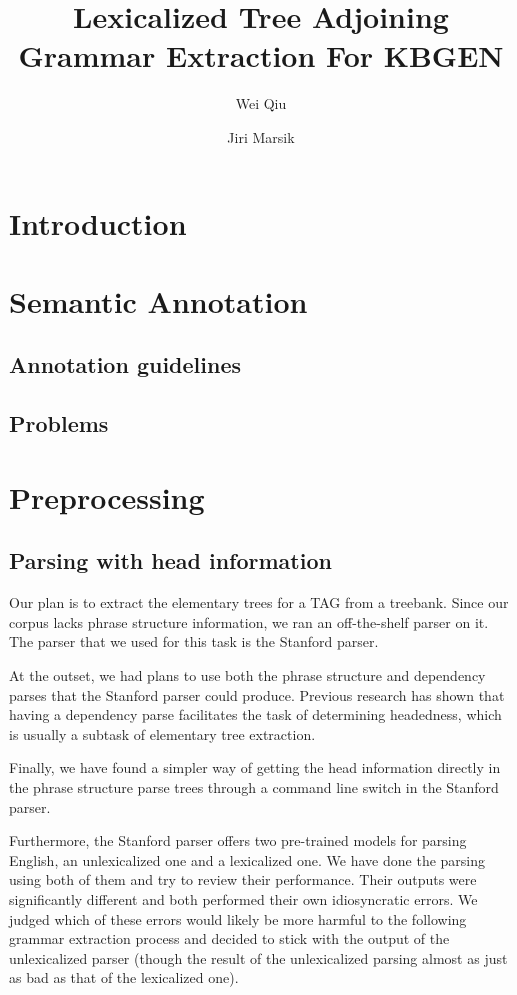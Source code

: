 \documentclass[a4paper]{article}
\title{Lexicalized Tree Adjoining Grammar Extraction For KBGEN}
\author{Wei Qiu \and Jiri Marsik}
\begin{document}
\maketitle
\begin{abstract}
\end{abstract}
\section{Introduction}
\section{Semantic Annotation}
\label{sec:sem-annot}
\subsection{Annotation guidelines}
\subsection{Problems}


\section{Preprocessing}

\subsection{Parsing with head information}

Our plan is to extract the elementary trees for a TAG from a treebank.
Since our corpus lacks phrase structure information, we ran an
off-the-shelf parser on it. The parser that we used for this task is
the Stanford parser.

At the outset, we had plans to use both the phrase structure and
dependency parses that the Stanford parser could produce. Previous
research has shown that having a dependency parse facilitates the task
of determining headedness, which is usually a subtask of elementary
tree extraction.

Finally, we have found a simpler way of getting the head information
directly in the phrase structure parse trees through a command line
switch in the Stanford parser.


Furthermore, the Stanford parser offers two pre-trained models for
parsing English, an unlexicalized one and a lexicalized one. We have
done the parsing using both of them and try to review their
performance. Their outputs were significantly different and both
performed their own idiosyncratic errors. We judged which of these
errors would likely be more harmful to the following grammar
extraction process and decided to stick with the output of the
unlexicalized parser (though the result of the unlexicalized parsing
almost as just as bad as that of the lexicalized one).
\end{document}
